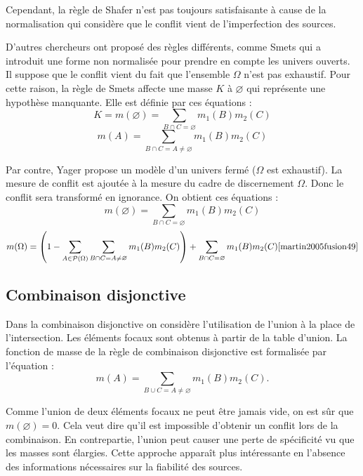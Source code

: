 Cependant, la règle de Shafer n’est pas toujours satisfaisante à cause de la
normalisation qui considère que le conflit vient de l’imperfection des sources.

D’autres chercheurs ont proposé des règles différents, comme Smets qui a introduit
une forme non normalisée pour prendre en compte les univers ouverts. Il suppose
que le conflit vient du fait que l’ensemble $\Omega$ n’est pas exhaustif. Pour
cette raison, la règle de Smets affecte une masse $K$ à $\varnothing$ qui représente
une hypothèse manquante. Elle est définie par ces équations :
\begin{equation}
K = m(\varnothing) = \sum_{B \cap C = \varnothing} m_1(B) m_2(C)
\end{equation}
\begin{equation}
m(A) = \sum_{B \cap C = A \neq \varnothing} m_1(B) m_2(C)
\end{equation}

Par contre, Yager propose un modèle d’un univers fermé ($\Omega$ est exhaustif).
La mesure de conflit est ajoutée à la mesure du cadre de discernement $\Omega$.
Donc le conflit sera transformé en ignorance. On obtient ces équations :
\begin{equation}
m(\varnothing) = \sum_{B \cap C = \varnothing} m_1(B) m_2(C)
\end{equation}
\begin{equation}
m(\Omega) = \left(1 - \sum_{A \in \mathcal{P}(\Omega)}
\sum_{B \cap C = A \neq \varnothing} m_1(B) m_2(C)\right) +
\sum_{B \cap C = \varnothing} m_1(B) m_2(C) \cite{martin2005fusion49}
\end{equation}

\subsection{Combinaison disjonctive}

Dans la combinaison disjonctive on considère l’utilisation de l’union à la place
de l’intersection. Les éléments focaux sont obtenus à partir de la table d’union.
La fonction de masse de la règle de combinaison disjonctive est formalisée par l'équation :
\begin{equation}
m(A) = \sum_{B \cup C = A \neq \varnothing} m_1(B) m_2(C).
\end{equation}

Comme l’union de deux éléments focaux ne peut être jamais vide, on est sûr
que $m(\varnothing)=0$. Cela veut dire qu’il est impossible d’obtenir un conflit
lors de la combinaison. En contrepartie, l'union peut causer une perte de spécificité
vu que les masses sont élargies. Cette approche apparaît plus intéressante en
l’absence des informations nécessaires sur la fiabilité des sources.

